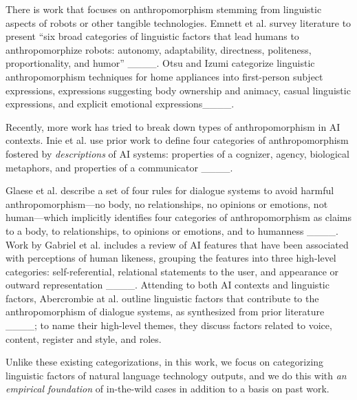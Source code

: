There is work that focuses on anthropomorphism stemming from linguistic aspects of robots or other tangible technologies. Emnett et al. survey literature to present ``six broad categories of linguistic factors that lead humans to anthropomorphize robots: autonomy, adaptability, directness, politeness, proportionality, and humor'' ____. Otsu and Izumi categorize linguistic anthropomorphism techniques for home appliances into first-person subject expressions, expressions suggesting body ownership and animacy, casual linguistic expressions, and explicit emotional expressions____.

Recently, more work has tried to break down types of anthropomorphism in AI contexts.  Inie et al. use prior work to define four categories of anthropomorphism fostered by \textit{descriptions} of AI systems: properties of a cognizer, agency, biological metaphors, and properties of a communicator ____. 

Glaese et al. describe a set of four rules for dialogue systems to avoid harmful anthropomorphism---no body, no relationships, no opinions or emotions, not human---which implicitly identifies four categories of anthropomorphism as claims to a body, to relationships, to opinions or emotions, and to humanness ____. Work by Gabriel et al. includes a review of AI features that have been associated with perceptions of human likeness, grouping the features into three high-level categories: self-referential, relational statements to the user, and appearance or outward representation ____. 
Attending to both AI contexts and linguistic factors, Abercrombie at al. outline linguistic factors that contribute to the anthropomorphism of dialogue systems, as synthesized from prior literature ____; to name their high-level themes, they discuss factors related to voice, content, register and style, and roles. 

Unlike these existing categorizations, in this work, we focus on categorizing linguistic factors of natural language technology outputs, and we do this with \textit{an empirical foundation} of in-the-wild cases in addition to a basis on past work.